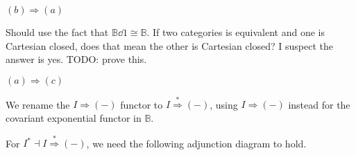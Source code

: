 \documentclass{article}
\begin{document}

$(b) \Rightarrow (a)$

\newcommand{\sar}{\overset{\ast}{\Rightarrow}}

Should use the fact that $\mathbb B \dd 1 \cong \mathbb B$. If two categories is equivalent and one is Cartesian closed,
does that mean the other is Cartesian closed? I suspect the answer is yes. TODO: prove this.

$(a) \Rightarrow (c)$

We rename the $I \Rightarrow (-)$ functor to $I \overset{\ast}{\Rightarrow} (-)$, using $I \Rightarrow (-)$ instead
for the covariant exponential functor in $\mathbb B$.

For $I^* \dashv I \sar (-)$, we need the following adjunction diagram to hold.
\begin{center}
\end{center}
\end{document}
